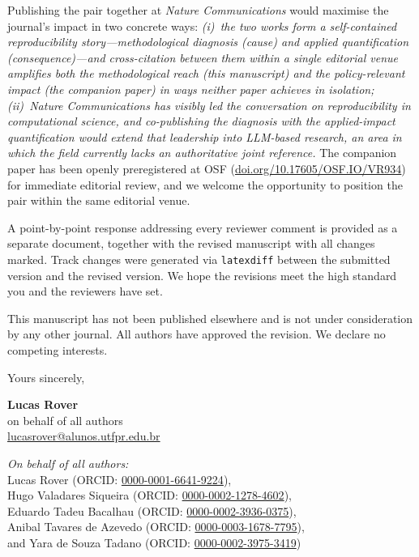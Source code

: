\documentclass[11pt,a4paper]{article}
\begin{document}
Publishing the pair together at \emph{Nature Communications} would maximise the journal's impact in two concrete ways: \emph{(i)~the two works form a self-contained reproducibility story---methodological diagnosis (cause) and applied quantification (consequence)---and cross-citation between them within a single editorial venue amplifies both the methodological reach (this manuscript) and the policy-relevant impact (the companion paper) in ways neither paper achieves in isolation; (ii)~\emph{Nature Communications} has visibly led the conversation on reproducibility in computational science, and co-publishing the diagnosis with the applied-impact quantification would extend that leadership into LLM-based research, an area in which the field currently lacks an authoritative joint reference.} The companion paper has been openly preregistered at OSF (\href{https://doi.org/10.17605/OSF.IO/VR934}{doi.org/10.17605/OSF.IO/VR934}) for immediate editorial review, and we welcome the opportunity to position the pair within the same editorial venue.

A point-by-point response addressing every reviewer comment is provided as a separate document, together with the revised manuscript with all changes marked. Track changes were generated via \texttt{latexdiff} between the submitted version and the revised version. We hope the revisions meet the high standard you and the reviewers have set.

This manuscript has not been published elsewhere and is not under consideration by any other journal. All authors have approved the revision. We declare no competing interests.

\bigskip

\noindent Yours sincerely,

\bigskip\bigskip

\noindent \textbf{Lucas Rover}\\
on behalf of all authors\\
\href{mailto:lucasrover@alunos.utfpr.edu.br}{lucasrover@alunos.utfpr.edu.br}\\

\bigskip

\noindent \textit{On behalf of all authors:}\\
Lucas Rover (ORCID: \href{https://orcid.org/0000-0001-6641-9224}{0000-0001-6641-9224}),\\
Hugo Valadares Siqueira (ORCID: \href{https://orcid.org/0000-0002-1278-4602}{0000-0002-1278-4602}),\\
Eduardo Tadeu Bacalhau (ORCID: \href{https://orcid.org/0000-0002-3936-0375}{0000-0002-3936-0375}),\\
Anibal Tavares de Azevedo (ORCID: \href{https://orcid.org/0000-0003-1678-7795}{0000-0003-1678-7795}),\\
and Yara de Souza Tadano (ORCID: \href{https://orcid.org/0000-0002-3975-3419}{0000-0002-3975-3419})
\end{document}
